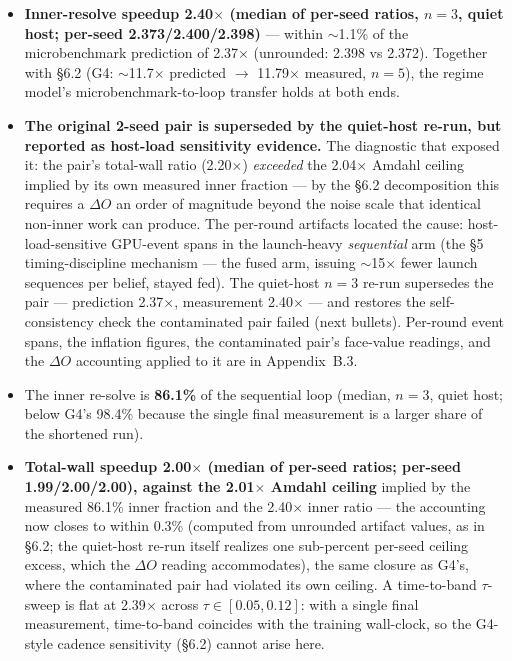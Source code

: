 \documentclass[11pt]{article}
\begin{document}
\begin{itemize}
\item \textbf{Inner-resolve speedup 2.40$\times$ (median of per-seed ratios, $n{=}3$,
quiet host; per-seed 2.373/2.400/2.398)} --- within $\sim$1.1\% of the microbenchmark
prediction of 2.37$\times$ (unrounded: 2.398 vs 2.372). Together with \S6.2 (G4:
$\sim$11.7$\times$ predicted $\to$ 11.79$\times$ measured, $n{=}5$), the regime model's
microbenchmark-to-loop transfer holds at both ends.
\item \textbf{The original 2-seed pair is superseded by the quiet-host re-run, but
reported as host-load sensitivity evidence.} The diagnostic
that exposed it: the pair's total-wall ratio (2.20$\times$) \emph{exceeded} the
2.04$\times$ Amdahl ceiling implied by its own measured inner fraction --- by the \S6.2
decomposition this requires a $\Delta O$ an order of magnitude beyond the noise scale
that identical non-inner work can produce. The per-round artifacts located the cause:
host-load-sensitive GPU-event spans in the launch-heavy \emph{sequential} arm (the \S5
timing-discipline mechanism --- the fused arm, issuing $\sim$15$\times$ fewer launch
sequences per belief, stayed fed). The quiet-host $n{=}3$ re-run supersedes the pair ---
prediction 2.37$\times$, measurement 2.40$\times$ --- and restores the self-consistency
check the contaminated pair failed (next bullets). Per-round event spans, the inflation
figures, the contaminated pair's face-value readings, and the $\Delta O$ accounting
applied to it are in Appendix~B.3.
\item The inner re-solve is \textbf{86.1\%} of the sequential loop (median, $n{=}3$,
quiet host; below G4's 98.4\% because the single final measurement is a larger share of
the shortened run).
\item \textbf{Total-wall speedup 2.00$\times$ (median of per-seed ratios; per-seed
1.99/2.00/2.00), against the 2.01$\times$ Amdahl ceiling} implied by the measured
86.1\% inner fraction and the 2.40$\times$ inner ratio --- the accounting now closes to
within 0.3\% (computed from unrounded artifact values, as in \S6.2; the quiet-host
re-run itself realizes one sub-percent per-seed ceiling excess, which the $\Delta O$
reading accommodates), the same closure as G4's, where the contaminated pair had
violated its own ceiling. A time-to-band $\tau$-sweep is flat at 2.39$\times$ across
$\tau \in [0.05, 0.12]$: with a single final measurement, time-to-band coincides with
the training wall-clock, so the G4-style cadence sensitivity (\S6.2) cannot arise here.

\end{itemize}
\end{document}
